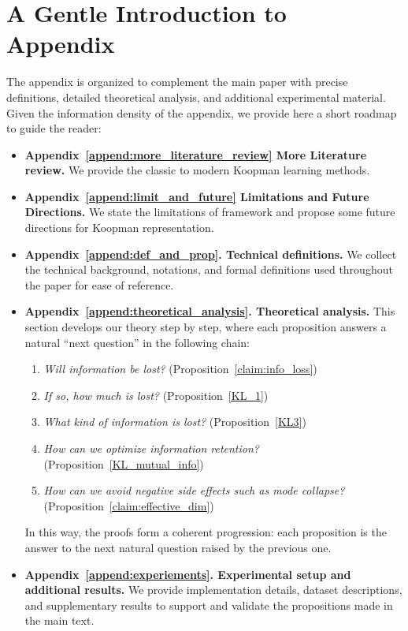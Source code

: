 \documentclass{article} %
\begin{document}
\clearpage
\section{A Gentle Introduction to Appendix}\label{append:navigation}

The appendix is organized to complement the main paper with precise definitions, detailed theoretical analysis, and additional experimental material. Given the information density of the appendix, we provide here a short roadmap to guide the reader:

\begin{itemize}
    \item \textbf{Appendix~\ref{append:more_literature_review} More Literature review.} We provide the classic to modern Koopman learning methods. 
    \item \textbf{Appendix~\ref{append:limit_and_future} Limitations and Future Directions.} We state the limitations of framework and propose some future directions for Koopman representation. 
    \item \textbf{Appendix~\ref{append:def_and_prop}. Technical definitions.} 
    We collect the technical background, notations, and formal definitions used throughout the paper for ease of reference.

    \item \textbf{Appendix~\ref{append:theoretical_analysis}. Theoretical analysis.} 
    This section develops our theory step by step, where each proposition answers a natural ``next question'' in the following chain:
    \begin{enumerate}
        \item[\textbf{Q1.}] \emph{Will information be lost?} (Proposition~\ref{claim:info_loss})  
        \item[\textbf{Q2.}] \emph{If so, how much is lost?} (Proposition~\ref{KL_1})  
        \item[\textbf{Q3.}] \emph{What kind of information is lost?} (Proposition~\ref{KL3})  
        \item[\textbf{Q4.}] \emph{How can we optimize information retention?} (Proposition~\ref{KL_mutual_info})  
        \item[\textbf{Q5.}] \emph{How can we avoid negative side effects such as mode collapse?} (Proposition~\ref{claim:effective_dim})  
    \end{enumerate}
    In this way, the proofs form a coherent progression: each proposition is the answer to the next natural question raised by the previous one.

    \item \textbf{Appendix~\ref{append:experiements}. Experimental setup and additional results.} 
    We provide implementation details, dataset descriptions, and supplementary results to support and validate the propositions made in the main text.
\end{itemize}
\end{document}
